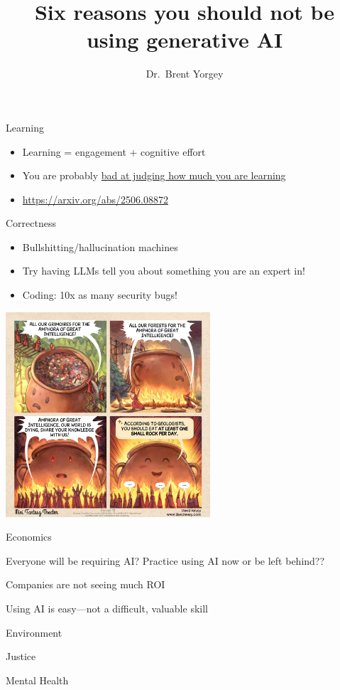 \documentclass[xcolor={usenames,dvipsnames,svgnames,table},12pt]{beamer}
\title{Six reasons you should not be using generative AI}
\date{}
\author{Dr.\ Brent Yorgey}
\begin{document}
\maketitle

\begin{frame}{Learning}
  \begin{itemize}
  \item Learning = engagement + cognitive effort
  \item You are probably \href{https://www.pnas.org/doi/10.1073/pnas.1821936116}{bad at judging how much you are learning}
  \item \url{https://arxiv.org/abs/2506.08872}
  \end{itemize}
\end{frame}

\begin{frame}{Correctness}
  \begin{itemize}
  \item Bullshitting/hallucination machines
  \item Try having LLMs tell you about something you are an expert in!
  \item Coding: 10x as many security bugs!
  \end{itemize}
\end{frame}

\begin{frame}
  \begin{center}
    \includegraphics[width=3in]{AGI}
  \end{center}
\end{frame}

\begin{frame}{Economics}
  \begin{center}
    \item Everyone will be requiring AI? Practice using AI now or be
      left behind??
    \item Companies are not seeing much ROI
    \item Using AI is easy---not a difficult, valuable skill
  \end{center}
\end{frame}

\begin{frame}{Environment}
\end{frame}

\begin{frame}{Justice}
\end{frame}

\begin{frame}{Mental Health}
\end{frame}
\end{document}
